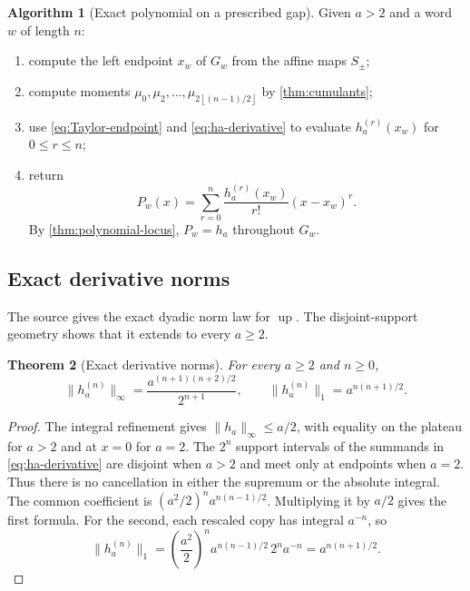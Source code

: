 \documentclass[11pt,oneside]{article}
\newtheorem{theorem}{Theorem}[section]
\theoremstyle{definition}
\newtheorem{algorithm}[theorem]{Algorithm}
\theoremstyle{remark}
\newcommand{\Up}{\operatorname{up}}
\newcommand{\floor}[1]{\left\lfloor #1\right\rfloor}
\begin{document}
\begin{algorithm}[Exact polynomial on a prescribed gap]
\label{alg:gap-polynomial}
Given $a>2$ and a word $w$ of length $n$:
\begin{enumerate}
\item compute the left endpoint $x_w$ of $G_w$ from the affine maps $S_\pm$;
\item compute moments $\mu_{0},\mu_2,\ldots,\mu_{2\floor{(n-1)/2}}$ by
      \cref{thm:cumulants};
\item use \eqref{eq:Taylor-endpoint} and \eqref{eq:ha-derivative} to evaluate
      $h_a^{(r)}(x_w)$ for $0\le r\le n$;
\item return
\[
 P_w(x)=\sum_{r=0}^{n}\frac{h_a^{(r)}(x_w)}{r!}(x-x_w)^r.
\]
By \cref{thm:polynomial-locus}, $P_w=h_a$ throughout $G_w$.
\end{enumerate}
\end{algorithm}

\subsection{Exact derivative norms}

The source gives the exact dyadic norm law for $\Up$.  The disjoint-support geometry shows
that it extends to every $a\ge2$.

\begin{theorem}[Exact derivative norms]
\label{thm:derivative-norms}
For every $a\ge2$ and $n\ge0$,
\begin{equation}
 \boxed{\quad
 \|h_a^{(n)}\|_{\infty}
 =\frac{a^{(n+1)(n+2)/2}}{2^{n+1}},
 \qquad
 \|h_a^{(n)}\|_{1}=a^{n(n+1)/2}.
 \quad}
 \label{eq:general-derivative-norms}
\end{equation}
\end{theorem}

\begin{proof}
The integral refinement gives $\|h_a\|_\infty\le a/2$, with equality on the plateau for
$a>2$ and at $x=0$ for $a=2$.  The $2^n$ support intervals of the summands in
\eqref{eq:ha-derivative} are disjoint when $a>2$ and meet only at endpoints when $a=2$.
Thus there is no cancellation in either the supremum or the absolute integral.  The common
coefficient is $(a^2/2)^n a^{n(n-1)/2}$.  Multiplying it by $a/2$ gives the first formula.
For the second, each rescaled copy has integral $a^{-n}$, so
\[
 \|h_a^{(n)}\|_1=
 \left(\frac{a^2}{2}\right)^n a^{n(n-1)/2}\,2^n a^{-n}
 =a^{n(n+1)/2}.
\]
\end{proof}
\end{document}
